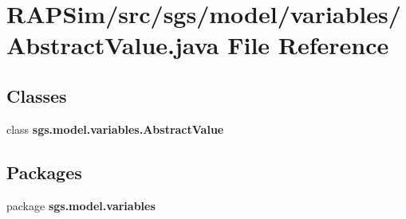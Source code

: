 \section{R\-A\-P\-Sim/src/sgs/model/variables/\-Abstract\-Value.java File Reference}
\label{_abstract_value_8java}
\subsection*{Classes}
\begin{DoxyCompactItemize}
\item 
class {\bf sgs.\-model.\-variables.\-Abstract\-Value}
\end{DoxyCompactItemize}
\subsection*{Packages}
\begin{DoxyCompactItemize}
\item 
package {\bf sgs.\-model.\-variables}
\end{DoxyCompactItemize}
